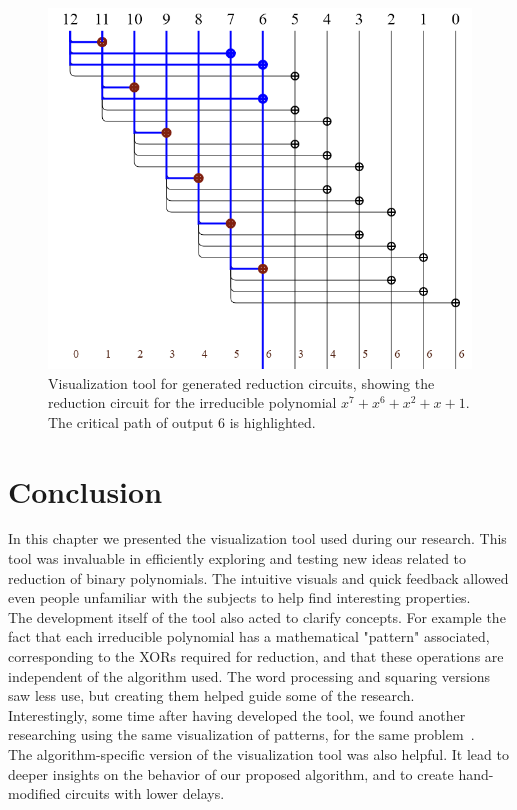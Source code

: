 \begin{figure}
  \caption{Visualization tool for generated reduction circuits, showing the reduction circuit for the irreducible polynomial $x^7 + x^6 + x^2 + x + 1$. The critical path of output 6 is highlighted.}
  \label{fig:circuit_reducing_critical_7_6_1_0}
  \centering
  \includegraphics[width = .8\columnwidth]{figures/reducing-critical-7-6-2-1-0.png}
\end{figure}

\section{Conclusion} \label{section:visual:conclusion}

In this chapter we presented the visualization tool used during our research. This tool was invaluable in efficiently exploring and testing new ideas related to reduction of binary polynomials. The intuitive visuals and quick feedback allowed even people unfamiliar with the subjects to help find interesting properties. \\

The development itself of the tool also acted to clarify concepts. For example the fact that each irreducible polynomial has a mathematical "pattern" associated, corresponding to the XORs required for reduction, and that these operations are independent of the algorithm used. The word processing and squaring versions saw less use, but creating them helped guide some of the research. \\

Interestingly, some time after having developed the tool, we found another researching using the same visualization of patterns, for the same problem~\cite{paper_com_imagens_dos_padroes}. \\

The algorithm-specific version of the visualization tool was also helpful. It lead to deeper insights on the behavior of our proposed algorithm, and to create hand-modified circuits with lower delays.